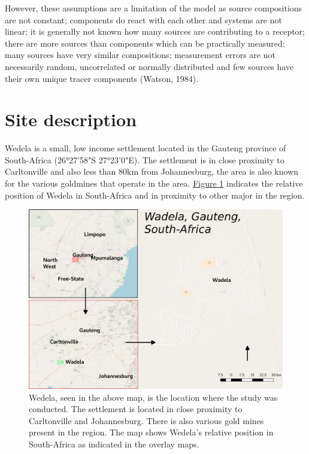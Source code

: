 \documentclass{nwureport}
\begin{document}
However, these assumptions are a limitation of the model as source compositions are not constant;
components do react with each other and systems are not linear; it is generally not known how many
sources are contributing to a receptor; there are more sources than components which can be practically
measured; many sources have very similar compositions; measurement errors are not necessarily random,
uncorrelated or normally distributed and few sources have their own unique tracer components (Watson,
1984).

\section{Site description}
Wedela is a small, low income settlement located in the Gauteng province of
South-Africa (26°27'58"S 27°23'0"E). The settlement is in close proximity to Carltonville
and also less than 80km from Johannesburg, the area is also known for the various goldmines
that operate in the area. \hyperref[fig:wadela]{Figure \ref{fig:wadela}}
indicates the relative position of Wedela in South-Africa and in proximity to other major
in the region.

\begin{figure}[!htb]
    \centering
    \includegraphics[width=\textwidth]{images/study_area_qgis.png}
    \caption[Study area: Wedela, Gauteng]{Wedela, seen in the above map, is the location where
    the study was conducted. The settlement is located in close proximity to Carltonville and Johannesburg.
    There is also various gold mines present in the region. The map shows Wedela's relative position in
    South-Africa as indicated in the overlay maps.}
    \label{fig:wadela}
\end{figure}
\end{document}
